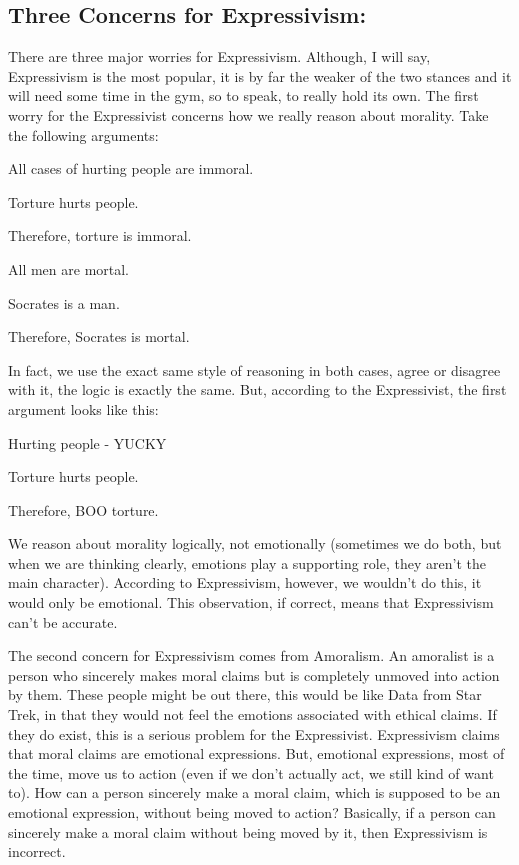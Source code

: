 \subsection{Three Concerns for Expressivism:}

There are three major worries for Expressivism. Although, I will say, Expressivism is the most popular, it is by far the weaker of the two stances and it will need some time in the gym, so to speak, to really hold its own. The first worry for the Expressivist concerns how we really reason about morality. Take the following arguments:

    \begin{earg}
    \item[]All cases of hurting people are immoral.
    \item[]Torture hurts people.
    \item[]Therefore, torture is immoral.
   \end{earg}

\begin{earg}
    \item[]All men are mortal.
    \item[]Socrates is a man.
    \item[]Therefore, Socrates is mortal.
\end{earg}

In fact, we use the exact same style of reasoning in both cases, agree or disagree with it, the logic is exactly the same. But, according to the Expressivist, the first argument looks like this:
\begin{earg}
    \item[]Hurting people - YUCKY
    \item[]Torture hurts people.
    \item[]Therefore, BOO torture. 
\end{earg}
We reason about morality logically, not emotionally (sometimes we do both, but when we are thinking clearly, emotions play a supporting role, they aren't the main character). According to Expressivism, however, we wouldn't do this, it would only be emotional. This observation, if correct, means that Expressivism can't be accurate. 

The second concern for Expressivism comes from Amoralism. An amoralist is a person who sincerely makes moral claims but is completely unmoved into action by them. These people might be out there, this would be like Data from Star Trek, in that they would not feel the emotions associated with ethical claims. If they do exist, this is a serious problem for the Expressivist. Expressivism claims that moral claims are emotional expressions. But, emotional expressions, most of the time, move us to action (even if we don’t actually act, we still kind of want to). How can a person sincerely make a moral claim, which is supposed to be an emotional expression, without being moved to action?  Basically, if a person can sincerely make a moral claim without being moved by it, then Expressivism is incorrect. 


